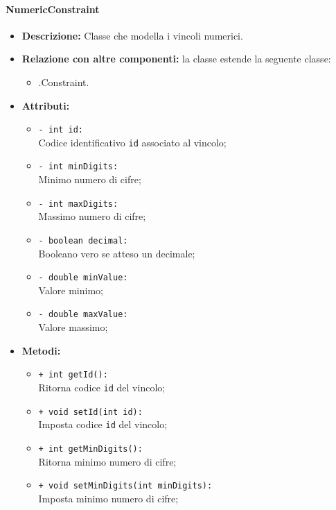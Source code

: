 \paragraph{NumericConstraint}
\label{botnumericconstraint}
\begin{flushleft}
\begin{itemize}
\item \textbf{Descrizione:} Classe che modella i vincoli numerici.
\item \textbf{Relazione con altre componenti:} la classe estende la seguente classe:
		\begin{itemize}
			\item \smodel{}.Constraint.
		\end{itemize}
\item \textbf{Attributi:}
\begin{sloppypar}
\begin{itemize}
\item \texttt{- int id:}\\ Codice identificativo \texttt{id} associato al vincolo;
\item \texttt{- int minDigits:}\\ Minimo numero di cifre;
\item \texttt{- int maxDigits:}\\ Massimo numero di cifre;
\item \texttt{- boolean decimal:}\\ Booleano vero se atteso un decimale;
\item \texttt{- double minValue:}\\ Valore minimo;
\item \texttt{- double maxValue:}\\ Valore massimo;
\end{itemize}
\end{sloppypar}
\item \textbf{Metodi:}
\begin{sloppypar}
\begin{itemize}
\item \texttt{+ int getId():}\\ Ritorna codice \texttt{id} del vincolo;
\item \texttt{+ void setId(int id):}\\ Imposta codice \texttt{id} del vincolo;
\item \texttt{+ int getMinDigits():}\\ Ritorna minimo numero di cifre;
\item \texttt{+ void setMinDigits(int minDigits):}\\ Imposta minimo numero di cifre;

\end{itemize}
\end{sloppypar}
\end{itemize}
\end{flushleft}
